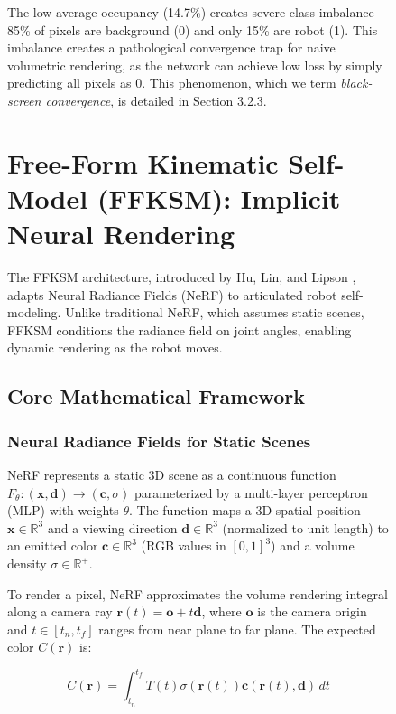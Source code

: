 \documentclass[12pt,a4paper,oneside]{report}
\begin{document}
\begin{figure}[H]
The low average occupancy (14.7\%) creates severe class imbalance---85\% of pixels are background (0) and only 15\% are robot (1). This imbalance creates a pathological convergence trap for naive volumetric rendering, as the network can achieve low loss by simply predicting all pixels as 0. This phenomenon, which we term \textit{black-screen convergence}, is detailed in Section 3.2.3.

\section{Free-Form Kinematic Self-Model (FFKSM): Implicit Neural Rendering}

The FFKSM architecture, introduced by Hu, Lin, and Lipson \cite{hu2024teaching}, adapts Neural Radiance Fields (NeRF) \cite{mildenhall2020nerf} to articulated robot self-modeling. Unlike traditional NeRF, which assumes static scenes, FFKSM conditions the radiance field on joint angles, enabling dynamic rendering as the robot moves.

\subsection{Core Mathematical Framework}

\subsubsection{Neural Radiance Fields for Static Scenes}

NeRF represents a static 3D scene as a continuous function $F_\theta: (\mathbf{x}, \mathbf{d}) \rightarrow (\mathbf{c}, \sigma)$ parameterized by a multi-layer perceptron (MLP) with weights $\theta$. The function maps a 3D spatial position $\mathbf{x} \in \mathbb{R}^3$ and a viewing direction $\mathbf{d} \in \mathbb{R}^3$ (normalized to unit length) to an emitted color $\mathbf{c} \in \mathbb{R}^3$ (RGB values in $[0,1]^3$) and a volume density $\sigma \in \mathbb{R}^+$.

To render a pixel, NeRF approximates the volume rendering integral along a camera ray $\mathbf{r}(t) = \mathbf{o} + t\mathbf{d}$, where $\mathbf{o}$ is the camera origin and $t \in [t_n, t_f]$ ranges from near plane to far plane. The expected color $C(\mathbf{r})$ is:

\begin{equation}
C(\mathbf{r}) = \int_{t_n}^{t_f} T(t) \sigma(\mathbf{r}(t)) \mathbf{c}(\mathbf{r}(t), \mathbf{d}) \, dt
\end{equation}


\end{figure}
\end{document}
